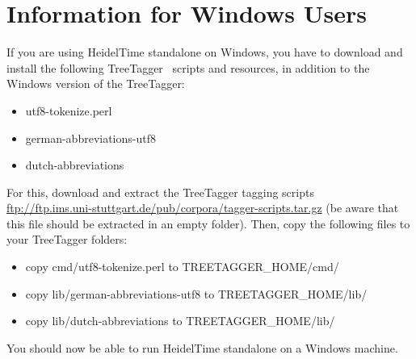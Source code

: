 \appendix
\section{Information for Windows Users}\label{app:windows}
If you are using HeidelTime standalone on Windows, you have to download and install the following TreeTagger~\cite{TreeTagger} scripts and resources, in addition to the Windows version of the TreeTagger:
\begin{itemize}
 \item utf8-tokenize.perl
 \item german-abbreviations-utf8
 \item dutch-abbreviations
\end{itemize}

For this, download and extract the TreeTagger tagging scripts\\
 \url{ftp://ftp.ims.uni-stuttgart.de/pub/corpora/tagger-scripts.tar.gz} (be aware that this file should be extracted in an empty folder). Then, copy the following files to your TreeTagger folders:
\begin{itemize}
 \item copy cmd/utf8-tokenize.perl to TREETAGGER\_HOME/cmd/
 \item copy lib/german-abbreviations-utf8 to TREETAGGER\_HOME/lib/
 \item copy lib/dutch-abbreviations to TREETAGGER\_HOME/lib/
\end{itemize}

You should now be able to run HeidelTime standalone on a Windows machine.
